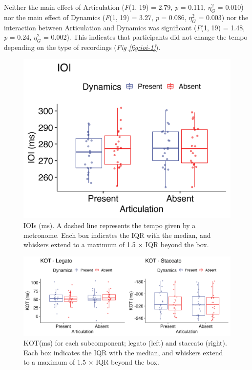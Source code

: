 \documentclass[
  man,floatsintext]{apa6}
\begin{document}
Neither the main effect of Articulation (\emph{F}(1, 19) = 2.79, \emph{p} = 0.111, \(\eta_G^2\) = 0.010) nor the main effect of Dynamics (\emph{F}(1, 19) = 3.27, \emph{p} = 0.086, \(\eta_G^2\) = 0.003) nor the interaction between Articulation and Dynamics was significant (\emph{F}(1, 19) = 1.48, \emph{p} = 0.24, \(\eta_G^2\) = 0.002). This indicates that participants did not change the tempo depending on the type of recordings (\emph{Fig \ref{fig:ioi-1}}).

\begin{figure}
\includegraphics[width=1\linewidth]{manuscript_files/figure-latex/plot-ioi-1-1} \caption{\label{fig:ioi-1}IOIs (ms). A dashed line represents the tempo given by a metronome. Each box indicates the IQR with the median, and whiskers extend to a maximum of 1.5 × IQR beyond the box.}\label{fig:plot-ioi-1}
\end{figure}

\begin{figure}
\includegraphics[width=1\linewidth]{manuscript_files/figure-latex/plot-kot-1-1} \caption{\label{fig:kot-1}KOT(ms) for each subcomponent; legato (left) and staccato (right). Each box indicates the IQR with the median, and whiskers extend to a maximum of 1.5 × IQR beyond the box.}\label{fig:plot-kot-1}
\end{figure}
\end{document}

